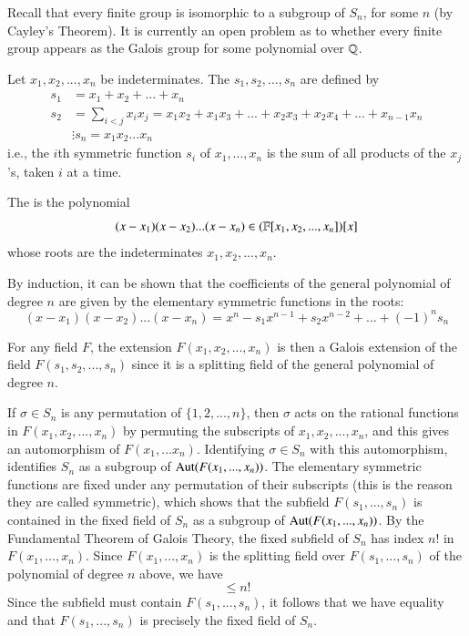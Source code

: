 \documentclass[12pt, a4paper, oneside, openright, titlepage]{book}
\begin{document}
Recall that every finite group is isomorphic to a subgroup of $S_n$, for some $n$ (by Cayley's Theorem). It is currently an open problem as to whether every finite group appears as the Galois group for some polynomial over $\mathbb Q$. 

\begin{defn}
    Let $x_1,x_2,...,x_n$ be indeterminates. The  $s_1,s_2,...,s_n$ are defined by \begin{align*}
        s_1 &= x_1+x_2+...+x_n \\
        s_2 &= \sum_{i<j}x_ix_j= x_1x_2+x_1x_3+ ... + x_2x_3 +x_2x_4+...+x_{n-1}x_n \\
        &\vdots 
        s_n = x_1x_2...x_n
    \end{align*}
    i.e., the $i$th symmetric function $s_i$ of $x_1,...,x_n$ is the sum of all products of the $x_j$'s, taken $i$ at a time.
\end{defn}

\begin{defn}
    The  is the polynomial \begin{equation*}
        (x-x_1)(x-x_2)...(x-x_n) \in (\mathbb F[x_1,x_2,...,x_n])[x]
    \end{equation*}
    whose roots are the indeterminates $x_1,x_2,...,x_n$.
\end{defn}

By induction, it can be shown that the coefficients of the general polynomial of degree $n$ are given by the elementary symmetric functions in the roots: \begin{equation*}
    (x-x_1)(x-x_2)...(x-x_n) = x^n - s_1x^{n-1}+s_2x^{n-2}+...+(-1)^ns_n
\end{equation*}

For any field $F$, the extension $F(x_1,x_2,...,x_n)$ is then a Galois extension of the field $F(s_1,s_2,...,s_n)$ since it is a splitting field of the general polynomial of degree $n$. 

If $\sigma \in S_n$ is any permutation of $\{1,2,...,n\}$, then $\sigma$ acts on the rational functions in $F(x_1,x_2,...,x_n)$ by permuting the subscripts of $x_1,x_2,...,x_n$, and this gives an automorphism of $F(x_1,...x_n)$. Identifying $\sigma \in S_n$ with this automorphism, identifies $S_n$ as a subgroup of $\operatorname{Aut}(F(x_1,...,x_n))$. The elementary symmetric functions are fixed under any permutation of their subscripts (this is the reason they are called symmetric), which shows that the subfield $F(s_1,...,s_n)$ is contained in the fixed field of $S_n$ as a subgroup of $\operatorname{Aut}(F(x_1,...,x_n))$. By the Fundamental Theorem of Galois Theory, the fixed subfield of $S_n$ has index $n!$ in $F(x_1,...,x_n)$. Since $F(x_1,...,x_n)$ is the splitting field over $F(s_1,...,s_n)$ of the polynomial of degree $n$ above, we have \begin{equation*}
    [F(x_1,...,x_n):F(s_1,...,s_n)] \leq n!
\end{equation*}
Since the subfield must contain $F(s_1,...,s_n)$, it follows that we have equality and that $F(s_1,...,s_n)$ is precisely the fixed field of $S_n$.
\end{document}
